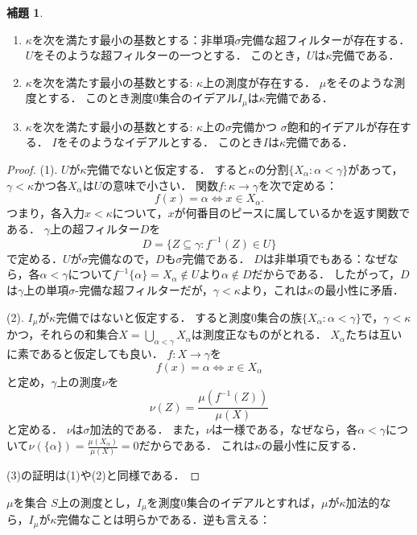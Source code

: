 \documentclass[uplatex]{jsarticle}
\renewcommand\subset{\subseteq}
\theoremstyle{definition}
\newtheorem{lem}[thm]{補題}
\begin{document}
	\begin{lem}
		\begin{enumerate}
			\item $\kappa$を次を満たす最小の基数とする：非単項$\sigma$完備な超フィルターが存在する．
			$U$をそのような超フィルターの一つとする．
			このとき，$U$は$\kappa$完備である．
			\item $\kappa$を次を満たす最小の基数とする: $\kappa$上の測度が存在する．
			$\mu$をそのような測度とする．
			このとき測度$0$集合のイデアル$I_\mu$は$\kappa$完備である．
			\item $\kappa$を次を満たす最小の基数とする: $\kappa$上の$\sigma$完備かつ $\sigma$飽和的イデアルが存在する．
			$I$をそのようなイデアルとする．
			このとき$I$は$\kappa$完備である．
		\end{enumerate}
	\end{lem}
	\begin{proof}
		(1). 
		$U$が$\kappa$完備でないと仮定する．
		すると$\kappa$の分割$\{ X_\alpha : \alpha < \gamma \}$があって，$\gamma < \kappa$かつ各$X_\alpha$は$U$の意味で小さい．
		関数$f \colon \kappa \to \gamma$を次で定める：
		\[
		f(x) = \alpha \iff x \in X_\alpha.
		\]
		つまり，各入力$x < \kappa$について，$x$が何番目のピースに属しているかを返す関数である．
		$\gamma$上の超フィルター$D$を
		\[
		D = \{ Z \subset \gamma : f^{-1}(Z) \in U \}
		\]
		で定める．$U$が$\sigma$完備なので，$D$も$\sigma$完備である．
		$D$は非単項でもある：なぜなら，各$\alpha < \gamma$について$f^{-1}\{\alpha\} = X_\alpha \not \in U$より$\alpha \not \in D$だからである．
		したがって，$D$は$\gamma$上の単項$\sigma$-完備な超フィルターだが，$\gamma < \kappa$より，これは$\kappa$の最小性に矛盾．
		
		(2). $I_\mu$が$\kappa$完備ではないと仮定する．
		すると測度$0$集合の族$\{X_\alpha : \alpha < \gamma \}$で，$\gamma < \kappa$かつ，それらの和集合$X = \bigcup_{\alpha < \gamma} X_\alpha$は測度正なものがとれる．
		$X_\alpha$たちは互いに素であると仮定しても良い．
		$f \colon X \to \gamma$を
		\[
		f(x) = \alpha \iff x \in X_\alpha
		\]
		と定め，$\gamma$上の測度$\nu$を
		\[
		\nu(Z) = \frac{\mu(f^{-1}(Z))}{\mu(X)} 
		\]
		と定める．
		$\nu$は$\sigma$加法的である．
		また，$\nu$は一様である，なぜなら，各$\alpha < \gamma$について$\nu(\{\alpha\}) = \frac{\mu(X_\alpha)}{\mu(X)} = 0$だからである．
		これは$\kappa$の最小性に反する．
		
		(3)の証明は(1)や(2)と同様である．
	\end{proof}
	
	$\mu$を集合 $S$上の測度とし，$I_\mu$を測度$0$集合のイデアルとすれば，$\mu$が$\kappa$加法的なら，$I_\mu$が$\kappa$完備なことは明らかである．逆も言える：
	
\end{document}
